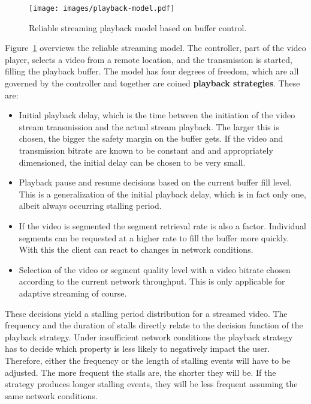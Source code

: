 \begin{figure}[htb]
	\centering
	\texttt{[image: images/playback-model.pdf]}
	\caption{Reliable streaming playback model based on buffer control.}
\label{c3:fig:playback-model}
\end{figure}

Figure~\ref{c3:fig:playback-model} overviews the reliable streaming model. The controller, part of the video player, selects a video from a remote location, and the transmission is started, filling the playback buffer. The model has four degrees of freedom, which are all governed by the controller and together are coined \textbf{playback strategies}. These are:

\begin{itemize}
	\item Initial playback delay, which is the time between the initiation of the video stream transmission and the actual stream playback. The larger this is chosen, the bigger the safety margin on the buffer gets. If the video and transmission bitrate are known to be constant and and appropriately dimensioned, the initial delay can be chosen to be very small.

	\item Playback pause and resume decisions based on the current buffer fill level. This is a generalization of the initial playback delay, which is in fact only one, albeit always occurring stalling period.

	\item If the video is segmented the segment retrieval rate is also a factor. Individual segments can be requested at a higher rate to fill the buffer more quickly. With this the client can react to changes in network conditions.

	\item Selection of the video or segment quality level with a video bitrate chosen according to the current network throughput. This is only applicable for adaptive streaming of course.
\end{itemize}


These decisions yield a stalling period distribution for a streamed video. The frequency and the duration of stalls directly relate to the decision function of the playback strategy. Under insufficient network conditions the playback strategy has to decide which property is less likely to negatively impact the user. Therefore, either the frequency or the length of stalling events will have to be adjusted. The more frequent the stalls are, the shorter they will be. If the strategy produces longer stalling events, they will be less frequent assuming the same network conditions.

